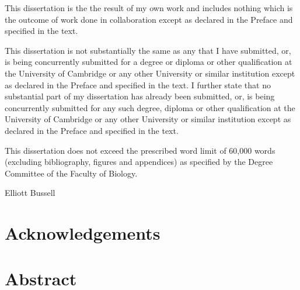 This dissertation is the the result of my own work and includes nothing which is the outcome
of work done in collaboration except as declared in the Preface and specified in the text.

This dissertation is not substantially the same as any that I have submitted, or, is being
concurrently submitted for a degree or diploma or other qualification at the University of
Cambridge or any other University or similar institution except as declared in the Preface and
specified in the text. I further state that no substantial part of my dissertation has already
been submitted, or, is being concurrently submitted for any such degree, diploma or other
qualification at the University of Cambridge or any other University or similar institution
except as declared in the Preface and specified in the text.

This dissertation does not exceed the prescribed word limit of 60,000 words (excluding
bibliography, figures and appendices) as specified by the Degree Committee of the Faculty
of Biology.

\vspace*{2cm}

Elliott Bussell
\cleardoublepage

\chapter*{Acknowledgements}
\label{sec:acknowledgements}
\vspace*{-10mm}

\blindtext

\cleardoublepage

\chapter*{Abstract}
\label{sec:abstract}
\vspace*{-10mm}

\blindtext

\cleardoublepage

\setcounter{tocdepth}{2}		%
\tableofcontents				%
\cleardoublepage

\listoffigures
\cleardoublepage

\listoftables
\cleardoublepage